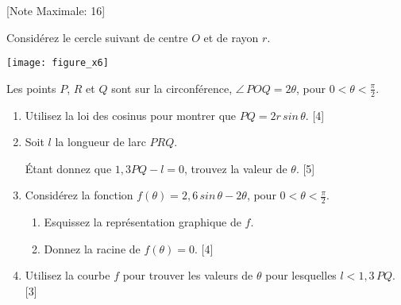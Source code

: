 \begin{question}
  \hspace*{\fill} [Note Maximale: 16]\par
  \medskip
  \noindent Considérez le cercle suivant de centre $O$ et de rayon $r$.\par
  \medskip
  \begin{center} %
    \texttt{[image: figure\_x6]}\par
    \noindent Les points $P$, $R$ et $Q$ sont sur la circonférence, $\angle\,POQ = 2\theta$, pour $0 < \theta < \frac{\pi}{2}$.\par
  \end{center} %

  \begin{enumerate}[label=(\alph*)]
    \item Utilisez la loi des cosinus pour montrer que $PQ = 2r\,sin\,\theta$.\hspace*{\fill} [4]
    \item Soit $l$ la longueur de larc $PRQ$.\par
      Étant donnez que $1,3PQ - l = 0$, trouvez la valeur de $\theta$.\hspace*{\fill} [5]
    \item Considérez la fonction $f(\theta) = 2,6\,sin\,\theta - 2\theta$, pour $0 < \theta < \frac{\pi}{2}$.
      \begin{enumerate}[label=(\roman*)]
        \item Esquissez la représentation graphique de $f$.
        \item Donnez la racine de $f(\theta) = 0$.\hspace*{\fill} [4]
      \end{enumerate}
    \item Utilisez la courbe $f$ pour trouver les valeurs de $\theta$ pour lesquelles $l < 1,3\,PQ$.\hspace*{\fill} [3]
  \end{enumerate}
\end{question}
